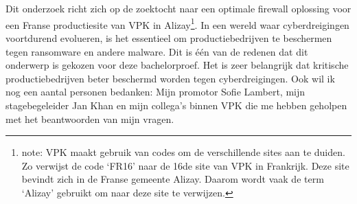 
\chapter*{}%
\label{ch:voorwoord}

Dit onderzoek richt zich op de zoektocht naar een optimale firewall oplossing voor een Franse productiesite van VPK in Alizay\footnote{note: VPK maakt gebruik van codes om de verschillende sites aan te duiden. Zo verwijst de code ‘FR16’ naar de 16de site van VPK in Frankrijk. Deze site bevindt zich in de Franse gemeente Alizay. Daarom wordt vaak de term ‘Alizay’ gebruikt om naar deze site te verwijzen.}. In een wereld waar cyberdreigingen voortdurend evolueren, is het essentieel om productiebedrijven te beschermen tegen ransomware en andere malware. Dit is één van de redenen dat dit onderwerp is gekozen voor deze bachelorproef. Het is zeer belangrijk dat kritische productiebedrijven beter beschermd worden tegen cyberdreigingen.
Ook wil ik nog een aantal personen bedanken: Mijn promotor Sofie Lambert, mijn stagebegeleider Jan Khan en mijn collega's binnen VPK die me hebben geholpen met het beantwoorden van mijn vragen.


